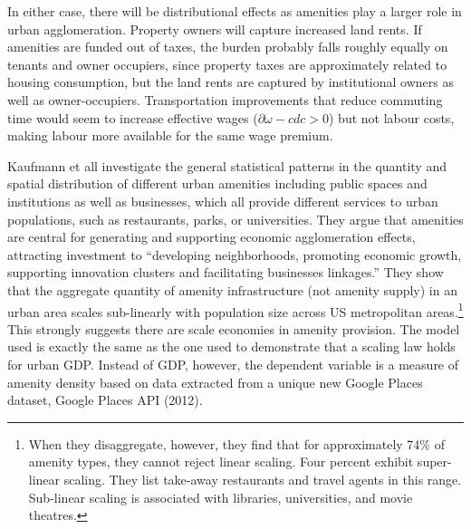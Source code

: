 In either case, there will be distributional effects as amenities play a larger role in urban agglomeration. Property owners will capture increased land rents. If amenities are funded out of taxes, the burden probably falls roughly equally on tenants and owner occupiers, since property taxes are approximately related to housing consumption, but the land rents are captured by institutional owners as well as owner-occupiers.
Transportation improvements that reduce commuting time would seem to increase effective wages ($\partial{\omega-cd}{c}>0$) but not labour costs, making labour more available for the same wage premium. 

Kaufmann et all investigate the  general statistical patterns in the quantity and spatial distribution of different urban amenities including public spaces and institutions as well as businesses, which all provide different services to urban populations, such as  restaurants, parks, or universities. 
They argue that amenities are  central for generating and supporting economic agglomeration effects, attracting investment to ``developing neighborhoods, promoting economic growth, supporting innovation clusters and facilitating businesses linkages.'' 
They show that the aggregate quantity of amenity infrastructure (not amenity supply)  in an urban area  scales sub-linearly  with population size across US metropolitan areas.\footnote{When they disaggregate, however, they find that for approximately 74\% of amenity types, they cannot reject linear scaling. Four percent exhibit super-linear scaling. They list take-away restaurants and travel agents in this range. Sub-linear scaling is associated with libraries, universities, and movie theatres.} This strongly suggests there are scale economies in amenity provision. The model used is exactly the same as the one used to demonstrate that a scaling law holds for  urban GDP. Instead of GDP, however, the dependent variable is a measure of amenity density based on data extracted from a unique new Google Places dataset, Google Places API (2012). 



